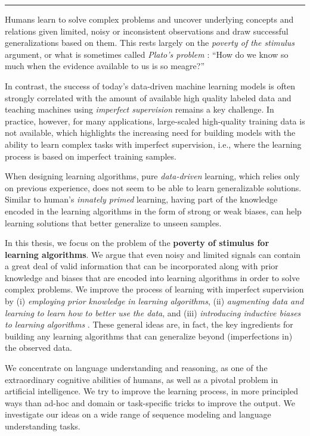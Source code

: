\summary
\vspace{-30pt}
\textbf{} 
\vspace{-10pt}\par\noindent\rule{\textwidth}{0.4pt}

Humans learn to solve complex problems and uncover underlying concepts and relations given limited, noisy or inconsistent observations and draw successful generalizations based on them. This rests largely on the \emph{poverty of the stimulus} argument, or what is sometimes called \emph{Plato’s problem}%
: ``How do we know so much when the evidence available to us is so meagre?''

In contrast, the success of today's data-driven machine learning models is often strongly correlated with the amount of available high quality labeled data
and teaching machines using \emph{imperfect supervision} remains a key challenge. In practice, however, for many applications, large-scaled high-quality training data is not available, which highlights the increasing need for building models with the ability to learn complex tasks with imperfect supervision, i.e., where the learning process is based on imperfect training samples. %

When designing learning algorithms, pure \emph{data-driven} learning, which relies only on previous experience, does not seem to be able to learn generalizable solutions.
Similar to human's \emph{innately primed} learning, having part of the knowledge encoded in the learning algorithms in the form of strong or weak biases, can help learning solutions that better generalize to unseen samples. %

In this thesis, we focus on the problem of the \textbf{poverty of stimulus for learning algorithms}. We argue that even noisy and limited signals can contain a great deal of valid information that can be incorporated along with prior knowledge and biases that are encoded into learning algorithms in order to solve complex problems. We improve the process of learning with imperfect supervision by (i) \emph{employing  prior knowledge in learning algorithms}, (ii) \emph{augmenting data and learning to learn how to better use the data}, and (iii) \emph{introducing inductive biases to learning algorithms} . 
%
These general ideas are, in fact, the key ingredients for building any learning algorithms that can generalize beyond (imperfections in) the observed data. %

We concentrate on language understanding and reasoning, as one of the extraordinary cognitive abilities of humans, as well as a pivotal problem in artificial intelligence. We try to improve the learning process, in more principled ways than ad-hoc and domain or task-specific tricks to improve the output. We investigate our ideas on a wide range of sequence modeling and language understanding tasks.


